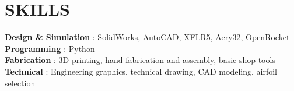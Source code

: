 \documentclass[letterpaper,11pt]{article}
\begin{document}
%
\section{SKILLS}
 \begin{itemize}[leftmargin=0in, label={}]
    \small{\item{
         \textbf{Design \& Simulation} {: SolidWorks, AutoCAD, XFLR5, Aery32, OpenRocket}\vspace{2pt} \\
     \textbf{Programming} {: Python}\vspace{2pt} \\
     \textbf{Fabrication} {: 3D printing, hand fabrication and assembly, basic shop tools}\vspace{2pt} \\
     \textbf{Technical} {: Engineering graphics, technical drawing, CAD modeling, airfoil selection}
    }}
 \end{itemize}

\end{document}
